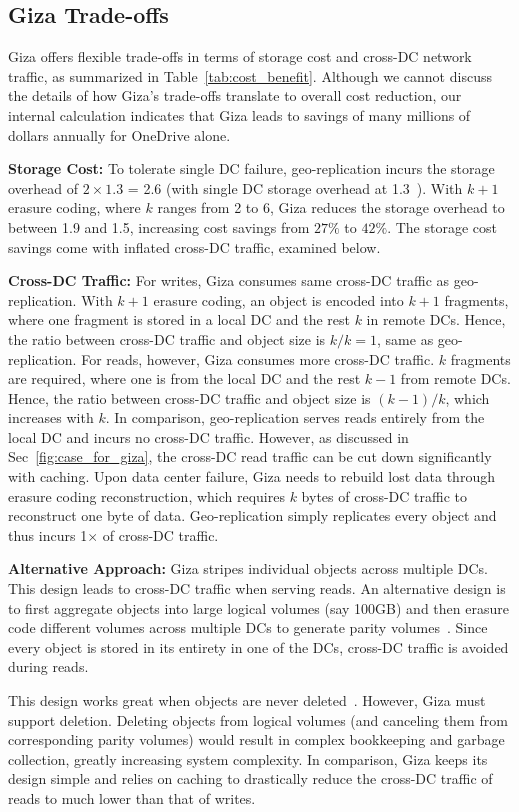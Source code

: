 \subsection{Giza Trade-offs}
\label{sec:alternative}

Giza offers flexible trade-offs in terms of storage cost and cross-DC network traffic,
as summarized in Table~\ref{tab:cost_benefit}.
Although we cannot discuss the details of how Giza's trade-offs translate to overall cost
reduction, our internal calculation indicates that Giza leads to savings of
many millions of dollars annually for OneDrive alone.

{\bf Storage Cost:} To tolerate single DC failure, geo-replication incurs the
storage overhead of $2\times1.3$ = 2.6 (with single DC storage overhead at 1.3~\cite{huang12erasure}).
With $k+1$ erasure coding, where $k$ ranges from 2 to 6, Giza reduces the
storage overhead to between 1.9 and 1.5, increasing cost savings from $27\%$ to
$42\%$. The storage cost savings come with inflated cross-DC traffic, examined
below.

{\bf Cross-DC Traffic:} For writes, Giza consumes same cross-DC traffic as
geo-replication. With $k+1$ erasure coding, an object is encoded into $k+1$
fragments, where one fragment is stored in a local DC and the rest $k$ in remote
DCs. Hence, the ratio between cross-DC traffic and object size is $k/k = 1$,
same as geo-replication. For reads, however, Giza consumes more cross-DC
traffic. $k$ fragments are required, where one is from the local DC and the rest
$k-1$ from remote DCs. Hence, the ratio between cross-DC traffic and object size
is $(k-1)/k$, which increases with $k$. In comparison, geo-replication serves
reads entirely from the local DC and incurs no cross-DC traffic. However, as
discussed in Sec~\ref{fig:case_for_giza}, the cross-DC read traffic can be cut
down significantly with caching. Upon data center failure, Giza needs to rebuild
lost data through erasure coding reconstruction, which requires $k$ bytes of
cross-DC traffic to reconstruct one byte of data. Geo-replication simply
replicates every object and thus incurs 1$\times$ of cross-DC traffic.

{\bf Alternative Approach:} Giza stripes individual objects across multiple DCs. This design leads to cross-DC traffic when serving reads. An alternative design is to first aggregate objects into large logical volumes (say 100GB) and then erasure code different volumes across multiple DCs to generate parity volumes~\cite{f4:osdi14}. Since every object is stored in its entirety in one of the DCs, cross-DC traffic is avoided during reads.

This design works great when objects are never deleted~\cite{f4:osdi14}. However, Giza must support deletion. Deleting objects from logical volumes (and canceling them from corresponding parity volumes) would result in complex bookkeeping and garbage collection, greatly increasing system complexity. In comparison, Giza keeps its design simple and relies on caching to drastically reduce the cross-DC traffic of reads to much lower than that of writes. 

